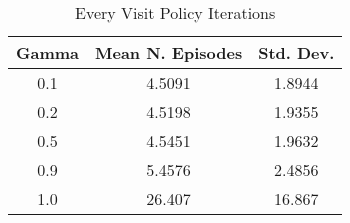 \documentclass[letterpaper]{article} %
\begin{document}
\begin{itemize}
	    \begin{table}[htbp]
	    \caption{Every Visit Policy Iterations}
	    \label{tab:gamma}
	    \centering
	    \begin{tabular}{|c|c|c|}
	    \hline
	    Gamma & Mean N. Episodes   & Std. Dev. \\ \hline
	    0.1   & 4.5091             & 1.8944    \\ \hline
	    0.2   & 4.5198             & 1.9355    \\ \hline
	    0.5   & 4.5451             & 1.9632    \\ \hline
	    0.9   & 5.4576             & 2.4856    \\ \hline
	    1.0   & 26.407             & 16.867    \\ \hline
	    \end{tabular}
	    \end{table}
	\end{itemize}
\end{document}
